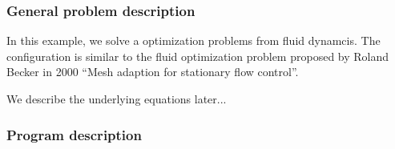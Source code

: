 \subsubsection{General problem description}
In this example, we solve a optimization problems from 
fluid dynamcis. The configuration is similar to 
the fluid optimization problem proposed by Roland Becker 
in 2000 ``Mesh adaption for stationary flow control''.

We describe the underlying equations later...
\subsubsection{Program description}

